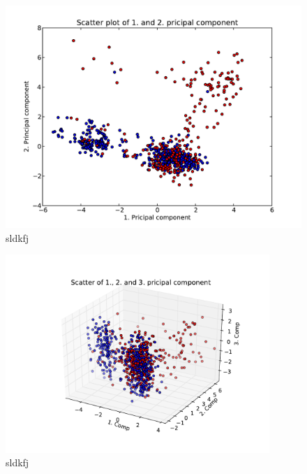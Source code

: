\begin{figure}
    \centering
    \includegraphics[width=\textwidth]{../sessions/15-new-principal-components-analysis/plots/scatter-principal-components-800-points.pdf}
    \caption{sldkfj}\label{fig:pca-scatter-2d}
\end{figure}
\begin{figure}
    \centering
    \includegraphics[width=100mm,bb=90 20 500 380,clip]{../sessions/15-new-principal-components-analysis/plots/scatter-principal-components-3d-1-800points.pdf}
    \caption{sldkfj}\label{fig:pca-scatter-3d}
\end{figure}

